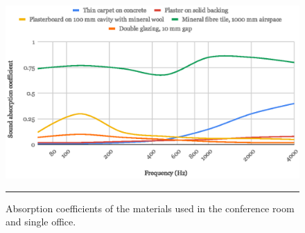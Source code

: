 \begin{figure}[htbp]
	\centering
	\includegraphics[width=.9\textwidth]{figures/Materials_absorption.eps}
	\rule{\textwidth}{0.5pt} %
	\caption{Absorption coefficients of the materials used in the conference room and single office.}
	\label{fig:absorption_coefs}
\end{figure}